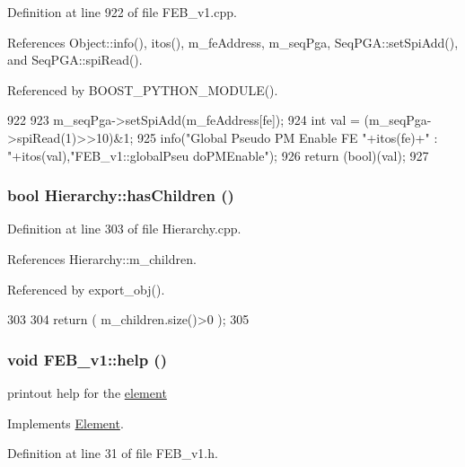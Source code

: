 Definition at line 922 of file FEB\_\-v1.cpp.

References Object::info(), itos(), m\_\-feAddress, m\_\-seqPga, SeqPGA::setSpiAdd(), and SeqPGA::spiRead().

Referenced by BOOST\_\-PYTHON\_\-MODULE().


\begin{DoxyCode}
922                                          {
923   m_seqPga->setSpiAdd(m_feAddress[fe]);
924   int val = (m_seqPga->spiRead(1)>>10)&1;
925   info("Global Pseudo PM Enable FE "+itos(fe)+" : "+itos(val),"FEB_v1::globalPseu
      doPMEnable");
926   return (bool)(val);
927 }
\end{DoxyCode}
\hypertarget{classHierarchy_a255174fe4d316d2a3f430dcb9dab29f1}{
\subsubsection[{hasChildren}]{\setlength{\rightskip}{0pt plus 5cm}bool Hierarchy::hasChildren ()}}
\label{classHierarchy_a255174fe4d316d2a3f430dcb9dab29f1}


Definition at line 303 of file Hierarchy.cpp.

References Hierarchy::m\_\-children.

Referenced by export\_\-obj().


\begin{DoxyCode}
303                               {
304   return ( m_children.size()>0 );
305 }
\end{DoxyCode}
\hypertarget{classFEB__v1_af93db546ad89ba7c2301fdc2314efd8a}{
\subsubsection[{help}]{\setlength{\rightskip}{0pt plus 5cm}void FEB\_\-v1::help ()}}
\label{classFEB__v1_af93db546ad89ba7c2301fdc2314efd8a}
printout help for the \hyperlink{namespaceelement}{element} 

Implements \hyperlink{classElement_a32c0de27acb08e17251cef88c3e9303a}{Element}.

Definition at line 31 of file FEB\_\-v1.h.


